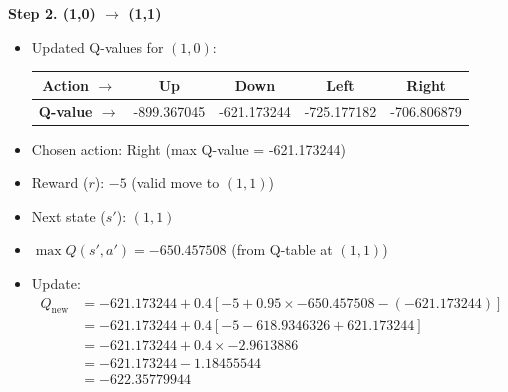 \documentclass{article}
\begin{document}
\begin{itemize}
\noindent\textbf{Step 2. (1,0) \(\rightarrow\) (1,1)}
\begin{itemize}
    \item Updated Q-values for \((1,0)\):
    \begin{tabular}{|c|c|c|c|c|}
        \textbf{Action $\rightarrow$ } & Up & Down & Left & Right \\
        \hline
        \textbf{Q-value $\rightarrow$ } &-899.367045 & -621.173244 & -725.177182 & -706.806879 \\
    \end{tabular}
    \vspace{10pt}
    \item Chosen action: Right (max Q-value = -621.173244)
    \item Reward (\(r\)): \(-5\) (valid move to \((1,1)\))
    \item Next state (\(s'\)): \((1,1)\)
    \item \(\max Q(s', a') = -650.457508\) (from Q-table at \((1,1)\))
    \item Update:
    \begin{align*}
        Q_{\text{new}} &= -621.173244 + 0.4 \left[ -5 + 0.95 \times -650.457508 - (-621.173244) \right] \\
        &= -621.173244 + 0.4 \left[ -5 - 618.9346326 + 621.173244 \right] \\
        &= -621.173244 + 0.4 \times -2.9613886 \\
        &= -621.173244 - 1.18455544 \\
        &= -622.35779944
    \end{align*}
\end{itemize}


\end{itemize}
\end{document}
